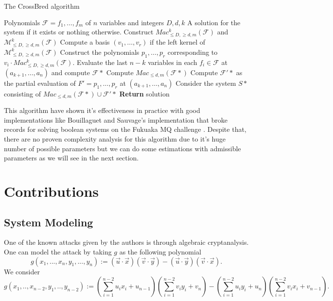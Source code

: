 \documentclass[english]{article}
\begin{document}
		\begin{algorithm}
			\caption{The CrossBred algorithm}\label{alg:crossbred}
			\begin{algorithmic}[1]
				\Require Polynomials $\mathcal{F} = {f_1, \dots, f_m}$ of $n$ variables and integers $D,d,k$
				\Ensure  A solution for the system if it exists or nothing otherwise.
				\State Construct $Mac_{\leq D, \geq d, m}^k(\mathcal{F})$ and $\mathcal{M}_{\leq D, \geq d, m}^k(\mathcal{F})$
				\State Compute a basis $(v_1,\dots,v_r)$ if the left kernel of $\mathcal{M}_{\leq D, \geq d, m}^k(\mathcal{F})$
				\State Construct the polynomials $p_1,\dots,p_r$ corresponding to $v_i \cdot Mac_{\leq D, \geq d, m}^k(\mathcal{F})$.
				\State Evaluate the last $n-k$ variables in each $f_i \in \mathcal{F}$ at $(a_{k+1},\dots,a_n)$ and compute $\mathcal{F}*$
				\State Compute $Mac_{\leq d, m}(\mathcal{F}*)$
				\State Compute $\mathcal{F}'*$ as the partial evaluation of $F' = {p_1,\dots,p_r}$ at $(a_{k+1},\dots,a_n)$
				\State Consider the system $S*$ consisting of $Mac_{\leq d, m}(\mathcal{F}*) \cup \mathcal{F}'*$
				\State \textbf{Return} solution
				\EndIf
				\EndFor
			\end{algorithmic}
		\end{algorithm}
		
		This algorithm have shown it's effectiveness in practice with good implementations like Bouillaguet and Sauvage's implementation \cite {BS23} that broke records for solving boolean systems on the Fukuaka MQ challenge \cite{MQFUK}. Despite that, there are no proven complexity analysis for this algorithm due to it's huge number of possible parameters but we can do some estimations with admissible parameters as we will see in the next section.

	\section{Contributions}
		
		\subsection{System Modeling}
		One of the known attacks given by the authors is through algebraic cryptanalysis.
		One can model the attack by taking $g$ as the following polynomial
		$$
		g(x_1,...,x_n,y_1,...,y_n) := (\vec{u} \cdot \vec{x})(\vec{v} \cdot \vec{y}) - (\vec{u} \cdot \vec{y})(\vec{v} \cdot \vec{x}).
		$$
		We consider
		$$
		g(x_1,..,x_{n-2},y_1,..,y_{n-2}) := (\sum_{i = 1}^{n-2}u_{i}x_{i} + u_{n-1})(\sum_{i = 1}^{n-2}v_{i}y_{i} + v_{n}) - (\sum_{i = 1}^{n-2}u_{i}y_{i} + u_{n})(\sum_{i = 1}^{n-2}v_{i}x_{i} + v_{n-1}).
		$$
		
\end{document}
